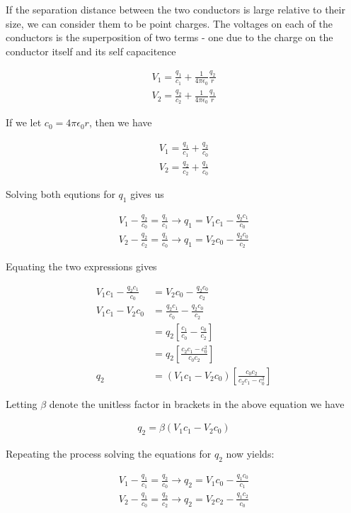 \documentclass[paper=a4, fontsize=11pt]{scrartcl} %
\numberwithin{equation}{section} %
\numberwithin{figure}{section} %
\numberwithin{table}{section} %
\begin{document}
If the separation distance between the two conductors is large relative to their size, we can consider them to be point charges. The voltages on each of the conductors is the superposition of two terms - one due to the charge on the conductor itself and its self capacitence

\begin{align}
V_1 = \frac{q_1}{c_1} + \frac{1}{4 \pi \epsilon_0} \frac{q_2}{r} \\
V_2 = \frac{q_2}{c_2} + \frac{1}{4 \pi \epsilon_0} \frac{q_1}{r}
\end{align} 

If we let $c_0 = 4 \pi \epsilon_0 r$, then we have

\begin{align}
V_1 = \frac{q_1}{c_1} + \frac{q_2}{c_0} \\
V_2 = \frac{q_2}{c_2} + \frac{q_1}{c_0} 
\end{align}

Solving both equtions for $q_1$ gives us

\begin{align}
V_1 - \frac{q_2}{c_0} = \frac{q_1}{c_1} \rightarrow q_1 = V_1 c_1 - \frac{q_2 c_1}{c_0} \\
V_2 - \frac{q_2}{c_2} = \frac{q_1}{c_0} \rightarrow q_1 = V_2 c_0 - \frac{q_2 c_0}{c_2}
\end{align}

Equating the two expressions gives 

\begin{align}
V_1 c_1 - \frac{q_2 c_1}{c_0} &= V_2 c_0 - \frac{q_2 c_0}{c_2} \\
V_1 c_1 - V_2 c_0 &= \frac{q_2 c_1}{c_0} - \frac{q_2 c_0}{c_2} \\
& = q_2 \left[ \frac{c_1}{c_0} - \frac{c_0}{c_2} \right] \\
& = q_2 \left[ \frac{c_2 c_1 - c_0^2}{c_0 c_2} \right] \\
q_2 &= \left(V_1 c_1 - V_2 c_0 \right) \left[\frac{c_0 c_2}{c_2 c_1 - c_0^2}\right]
\end{align}

Letting $\beta$ denote the unitless factor in brackets in the above equation we have 

\begin{align}
q_2 = \beta \left(V_1 c_1 - V_2 c_0\right)
\end{align}

Repeating the process solving the equations for $q_2$ now yields:

\begin{align}
V_1 - \frac{q_1}{c_1} = \frac{q_2}{c_0} \rightarrow q_2 = V_1 c_0 - \frac{q_1 c_0}{c_1} \\
V_2 - \frac{q_1}{c_0} = \frac{q_2}{c_2} \rightarrow q_2 = V_2 c_2 - \frac{q_1 c_2}{c_0}
\end{align}
\end{document}
